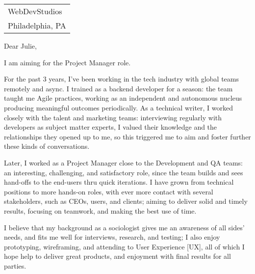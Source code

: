 \begin{tabular}{@{} l}
    WebDevStudios \\
    Philadelphia, PA
\end{tabular}

\bigskip %


Dear Julie,
\bigskip %


I am aiming for the %
Project Manager role.

For the past 3 years, I've been working in the tech industry with global teams remotely and async. 
I trained as a backend developer for a season: 
the team taught me Agile practices, working as an independent and autonomous nucleus
producing meaningful outcomes periodically.
As a technical writer, I worked closely with the talent and marketing teams:
interviewing regularly with developers as subject matter experts,
I valued their knowledge and the relationships they opened up to me,
so this triggered me to aim and foster further these kinds of conversations.

Later, I worked as a Project Manager close to the Development and QA teams:
an interesting, challenging, and satisfactory role, 
since the team builds and sees 
hand-offs to the end-users thru quick iterations.
I have grown from technical positions to more hands-on roles, with ever more contact 
with several stakeholders, such as CEOs, users, and clients; 
aiming to deliver solid and timely results, 
focusing on teamwork, 
and making the best use of time.

I believe that my background 
as a sociologist gives me an awareness of all sides' needs, 
and fits me well for interviews, research, and testing;
I also enjoy prototyping, wireframing, and attending to User Experience [UX], 
all of which I hope help to deliver great products, and enjoyment with final results for all parties.


